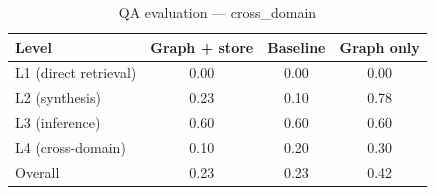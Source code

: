 \begin{table}[h]
\centering
\caption{QA evaluation — cross_domain}
\begin{tabular}{lccc}
\toprule
Level & Graph + store & Baseline & Graph only \\
\midrule
L1 (direct retrieval) & 0.00 & 0.00 & 0.00 \\
L2 (synthesis) & 0.23 & 0.10 & 0.78 \\
L3 (inference) & 0.60 & 0.60 & 0.60 \\
L4 (cross-domain) & 0.10 & 0.20 & 0.30 \\
\midrule
Overall & 0.23 & 0.23 & 0.42 \\
\bottomrule
\end{tabular}
\end{table}